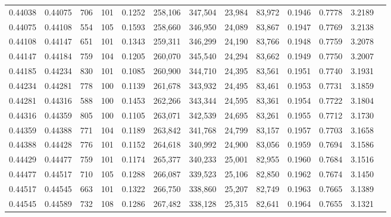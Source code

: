 \begin{tabular}{rrrrrrrrrrrrr}
0.44038 & 0.44075 &   706 & 101 &                                     0.1252 & 258,106 & 347,504 &  23,984 &  83,972 & 0.1946 & 0.7778 & 3.2189 \\
0.44075 & 0.44108 &   554 & 105 &                                     0.1593 & 258,660 & 346,950 &  24,089 &  83,867 & 0.1947 & 0.7769 & 3.2138 \\
0.44108 & 0.44147 &   651 & 101 &                                     0.1343 & 259,311 & 346,299 &  24,190 &  83,766 & 0.1948 & 0.7759 & 3.2078 \\
0.44147 & 0.44184 &   759 & 104 &                                     0.1205 & 260,070 & 345,540 &  24,294 &  83,662 & 0.1949 & 0.7750 & 3.2007 \\
0.44185 & 0.44234 &   830 & 101 &                                     0.1085 & 260,900 & 344,710 &  24,395 &  83,561 & 0.1951 & 0.7740 & 3.1931 \\
0.44234 & 0.44281 &   778 & 100 &                                     0.1139 & 261,678 & 343,932 &  24,495 &  83,461 & 0.1953 & 0.7731 & 3.1859 \\
0.44281 & 0.44316 &   588 & 100 &                                     0.1453 & 262,266 & 343,344 &  24,595 &  83,361 & 0.1954 & 0.7722 & 3.1804 \\
0.44316 & 0.44359 &   805 & 100 &                                     0.1105 & 263,071 & 342,539 &  24,695 &  83,261 & 0.1955 & 0.7712 & 3.1730 \\
0.44359 & 0.44388 &   771 & 104 &                                     0.1189 & 263,842 & 341,768 &  24,799 &  83,157 & 0.1957 & 0.7703 & 3.1658 \\
0.44388 & 0.44428 &   776 & 101 &                                     0.1152 & 264,618 & 340,992 &  24,900 &  83,056 & 0.1959 & 0.7694 & 3.1586 \\
0.44429 & 0.44477 &   759 & 101 &                                     0.1174 & 265,377 & 340,233 &  25,001 &  82,955 & 0.1960 & 0.7684 & 3.1516 \\
0.44477 & 0.44517 &   710 & 105 &                                     0.1288 & 266,087 & 339,523 &  25,106 &  82,850 & 0.1962 & 0.7674 & 3.1450 \\
0.44517 & 0.44545 &   663 & 101 &                                     0.1322 & 266,750 & 338,860 &  25,207 &  82,749 & 0.1963 & 0.7665 & 3.1389 \\
0.44545 & 0.44589 &   732 & 108 &                                     0.1286 & 267,482 & 338,128 &  25,315 &  82,641 & 0.1964 & 0.7655 & 3.1321 \\

\end{tabular}
